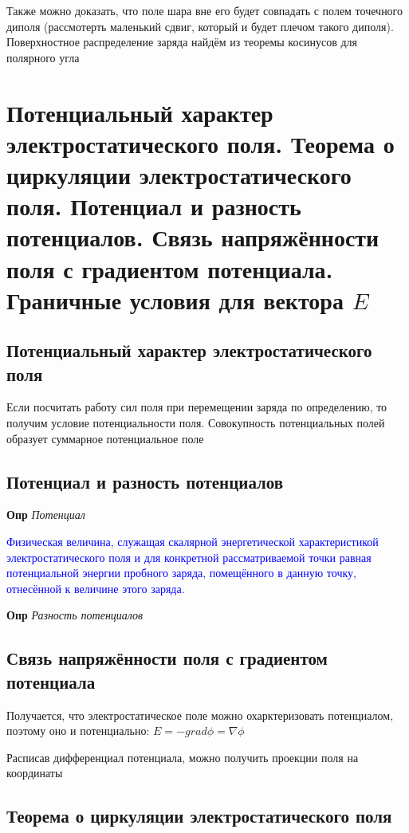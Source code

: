\documentclass[a4paper, 14pt]{article}
\begin{document}
    Также можно доказать, что поле шара вне его будет совпадать с полем точечного диполя (рассмотерть маленький сдвиг,
    который и будет плечом такого диполя).
    Поверхностное распределение заряда найдём из теоремы косинусов для полярного угла
    
    \section{Потенциальный характер электростатического поля.
    Теорема о циркуляции электростатического поля.
    Потенциал и разность потенциалов.
    Связь напряжённости поля с градиентом потенциала.
    Граничные условия для вектора $E$}
    
    \subsection{Потенциальный характер электростатического поля}
    
    Если посчитать работу сил поля при перемещении заряда по определению, то получим условие потенциальности поля.
    Совокупность потенциальных полей образует суммарное потенциальное поле
    
    \subsection{Потенциал и разность потенциалов}
    
    \textbf{Опр} \textit{Потенциал}
    
    \textcolor{blue}{Физическая величина, служащая скалярной энергетической характеристикой электростатического поля
    и для конкретной рассматриваемой точки равная потенциальной энергии пробного заряда, помещённого в данную
    точку, отнесённой к величине этого заряда.}
    
    \textbf{Опр} \textit{Разность потенциалов}
    
    \subsection{Связь напряжённости поля с градиентом потенциала}
    
    Получается, что электростатическое поле можно охарктеризовать потенциалом, поэтому оно и потенциально:
    $E = -grad \phi = \nabla \phi$
    
    Расписав дифференциал потенциала, можно получить проекции поля на координаты
    
    \subsection{Теорема о циркуляции электростатического поля}
    
\end{document}
